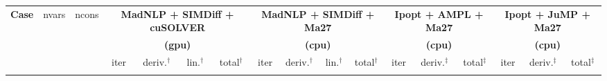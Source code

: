 \documentclass{standalone}
\begin{document}
\centering
\begin{tabular}{|l|c|c|cccc|cccc|ccc|ccc|}
  \hline
  \multirow{3}{*}{\textbf{Case}}
  & \multirow{3}{*}{nvars}
  & \multirow{3}{*}{ncons}
  & \multicolumn{4}{c|}{\textbf{MadNLP + SIMDiff + cuSOLVER}}
  & \multicolumn{4}{c|}{\textbf{MadNLP + SIMDiff + Ma27}}
  & \multicolumn{3}{c|}{\textbf{Ipopt + AMPL + Ma27}}
  & \multicolumn{3}{c|}{\textbf{Ipopt + JuMP + Ma27}}\\
  & & &\multicolumn{4}{c|}{\textbf{(gpu)}} &\multicolumn{4}{c|}{\textbf{(cpu)}} &\multicolumn{3}{c|}{\textbf{(cpu)}}&\multicolumn{3}{c|}{\textbf{(cpu)}}
  \\
  \cline{4-17}
  & & 
  & iter & deriv.$^\dag$ & lin.$^\dag$ & total$^\dag$
  & iter & deriv.$^\dag$ & lin.$^\dag$ & total$^\dag$
  & iter & deriv.$^\ddag$ & total$^\ddag$
  & iter & deriv.$^\ddag$ & total$^\ddag$
  \\
  \\
  \hline
\end{tabular}
\end{document}
